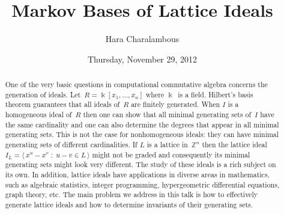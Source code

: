 \documentclass{UAmathtalk}
\author{Hara Charalambous}
\title{Markov Bases of Lattice Ideals}
\date{Thursday, November 29, 2012}
\begin{document}
\maketitle

\begin{abstract}
One of the very basic questions in computational commutative algebra concerns the generation of ideals. Let~$R=\Bbbk[x_1,\ldots,x_n]$ where $\Bbbk$~is a field. Hilbert's basis theorem guarantees that all ideals of~$R$ are finitely generated. When $I$ is a homogeneous ideal of~$R$ then one can show that all minimal generating sets of~$I$ have the same cardinality and one can also determine the degrees that appear in all minimal generating sets.  This is not the case for nonhomogeneous ideals: they can have minimal generating sets of different cardinalities.  If $L$ is a lattice in~$\mathbb{Z}^n$ then the lattice ideal $I_L=\langle\,x^u-x^v\;\colon\;u-v\in L\,\rangle$ might not be graded and consequently its minimal generating sets might look very different. The study of these ideals is a rich subject on its own. In addition, lattice ideals have applications in diverse areas in mathematics, such as algebraic statistics, integer programming, hypergeometric differential equations, graph theory, etc. The main problem we address in this talk is how to effectively generate lattice ideals and how to determine invariants of their generating sets.
\end{abstract}
\end{document}
